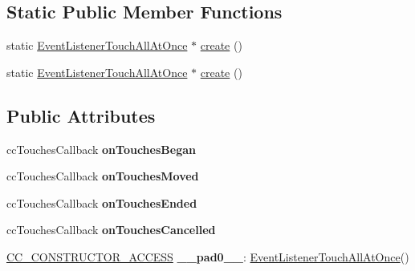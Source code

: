 \subsection*{Static Public Member Functions}
\begin{DoxyCompactItemize}
\item 
static \hyperlink{classEventListenerTouchAllAtOnce}{Event\+Listener\+Touch\+All\+At\+Once} $\ast$ \hyperlink{classEventListenerTouchAllAtOnce_a666b356fd573ab7cdd27340580382c06}{create} ()
\item 
static \hyperlink{classEventListenerTouchAllAtOnce}{Event\+Listener\+Touch\+All\+At\+Once} $\ast$ \hyperlink{classEventListenerTouchAllAtOnce_a085596935951516ce11ae20234f912cd}{create} ()
\end{DoxyCompactItemize}
\subsection*{Public Attributes}
\begin{DoxyCompactItemize}
\item 
\mbox{\label{classEventListenerTouchAllAtOnce_a0bb26e1b55e52b6044da9bd2b452edd3}} 
cc\+Touches\+Callback {\bfseries on\+Touches\+Began}
\item 
\mbox{\label{classEventListenerTouchAllAtOnce_abb50b1543efc52e158e82108fa853a52}} 
cc\+Touches\+Callback {\bfseries on\+Touches\+Moved}
\item 
\mbox{\label{classEventListenerTouchAllAtOnce_ad197b4c19309b9f170412b3898ecf3b9}} 
cc\+Touches\+Callback {\bfseries on\+Touches\+Ended}
\item 
\mbox{\label{classEventListenerTouchAllAtOnce_a8341a508b05cc41e899e0f61e882d6de}} 
cc\+Touches\+Callback {\bfseries on\+Touches\+Cancelled}
\item 
\mbox{\label{classEventListenerTouchAllAtOnce_aa89f1b3c60c40181ff4a1c118c632b26}} 
\hyperlink{_2cocos2d_2cocos_2base_2ccConfig_8h_a25ef1314f97c35a2ed3d029b0ead6da0}{C\+C\+\_\+\+C\+O\+N\+S\+T\+R\+U\+C\+T\+O\+R\+\_\+\+A\+C\+C\+E\+SS} {\bfseries \+\_\+\+\_\+pad0\+\_\+\+\_\+}\+: \hyperlink{classEventListenerTouchAllAtOnce}{Event\+Listener\+Touch\+All\+At\+Once}()
\end{DoxyCompactItemize}
